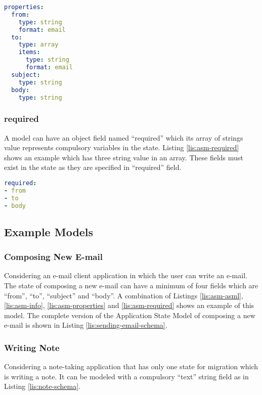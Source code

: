 \lstset{
  label=lis:asm-properties, caption=Application State Model “properties” field example.
}
\begin{lstlisting}[language=yaml]
properties:
  from:
    type: string
    format: email
  to:
    type: array
    items:
      type: string
      format: email
  subject:
    type: string
  body:
    type: string

\end{lstlisting}
\subsubsection{required}
A model can have an object field named “required” which its array of strings value represents compulsory variables in the state.
Listing \ref{lis:asm-required} shows an example which has three string value in an array. These fields must exist in the state as they are specified in “required” field.

\lstset{
  label=lis:asm-required, caption=Application State Model “required” field example.
}
\begin{lstlisting}[language=yaml]
required:
- from
- to
- body

\end{lstlisting}

\subsection{Example Models}
\subsubsection{Composing New E-mail}
Considering an e-mail client application in which the user can write an e-mail. The state of composing a new e-mail can have a minimum of four fields which are “from”, “to”, “subject” and “body”. A combination of Listings \ref{lis:asm-asml},  \ref{lis:asm-info},  \ref{lis:asm-properties} and  \ref{lis:asm-required} shows an example of this model.
The complete version of the Application State Model of composing a new e-mail is shown in Listing \ref{lis:sending-email-schema}.
\subsubsection{Writing Note}
Considering a note-taking application that has only one state for migration which is writing a note. It can be modeled with a compulsory “text” string field as in Listing \ref{lis:note-schema}.

